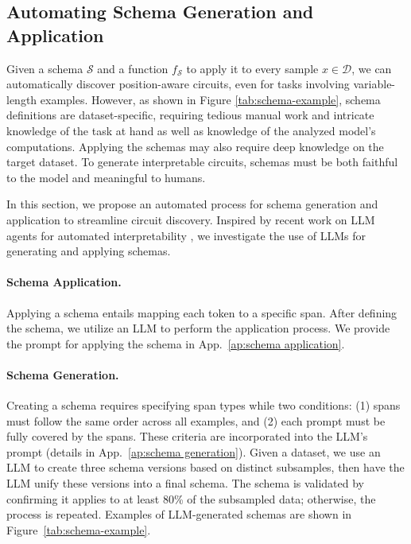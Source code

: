 \subsection{Automating Schema Generation and Application} \label{sec:schema-generation}
Given a schema $ \mathcal{S} $ and a function $ f_\mathcal{S} $ to apply it to every sample $ x \in \mathcal{D} $, we can automatically discover position-aware circuits, even for tasks involving variable-length examples. 
However, as shown in Figure \ref{tab:schema-example}, schema definitions are dataset-specific, requiring tedious manual work and intricate knowledge of the task at hand as well as knowledge of the analyzed model's computations.
Applying the schemas may also require deep knowledge on the target dataset.
To generate interpretable circuits, schemas must be both faithful to the model and meaningful to humans.

In this section, we propose an automated process for schema generation and application to streamline circuit discovery.
Inspired by recent work on LLM agents \cite{wang2024survey} for automated interpretability \cite{schwettmann2023find,shaham2024multimodal}, we investigate the use of LLMs for generating and applying schemas.


\paragraph{Schema Application.}
Applying a schema entails mapping each token to a specific span.
After defining the schema, we utilize an LLM to perform the application process.
We provide the prompt for applying the schema in App.~\ref{ap:schema application}.

\paragraph{Schema Generation.}
Creating a schema requires specifying span types while two conditions: (1) spans must follow the same order across all examples, and (2) each prompt must be fully covered by the spans.
These criteria are incorporated into the LLM's prompt (details in App.~\ref{ap:schema generation}).
Given a dataset, we use an LLM to create three schema versions based on distinct subsamples, then have the LLM unify these versions into a final schema.
The schema is validated by confirming it applies to at least 80\% of the subsampled data;
otherwise, the process is repeated.
Examples of LLM-generated schemas are shown in Figure~\ref{tab:schema-example}.


